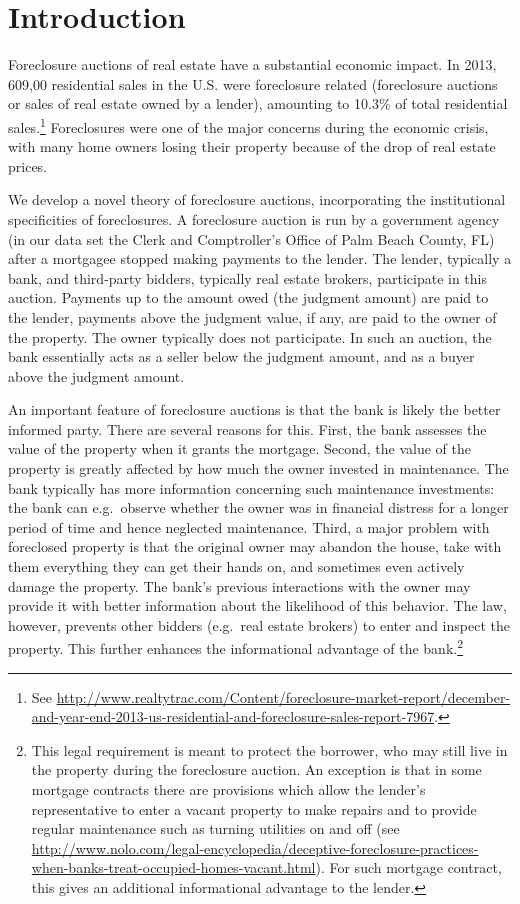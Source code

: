 \documentclass[11pt,twopage]{article}
\begin{document}
\section{Introduction}

Foreclosure auctions of real estate have a substantial economic
impact. In 2013, 609,00 residential sales in the U.S. were foreclosure related
(foreclosure auctions or sales of real estate
owned by a lender), amounting to 10.3\% of total residential sales.\footnote{See \url{http://www.realtytrac.com/Content/foreclosure-market-report/december-and-year-end-2013-us-residential-and-foreclosure-sales-report-7967}.}
Foreclosures were one of the major concerns during the economic
crisis, with many home owners losing their property because of the
drop of real estate prices. %

We develop a novel theory of foreclosure auctions, 
incorporating the institutional specificities of foreclosures. A
foreclosure auction is run by a government agency (in our data set
the Clerk and Comptroller's Office of Palm Beach County, FL) after a mortgagee stopped making
payments to the lender. The lender, typically a bank, and third-party
bidders, typically real estate brokers, 
participate in this auction. Payments up to the amount owed (the
judgment amount) are paid to the lender, payments above the judgment
value, if any, are paid to the owner of the property. The owner
typically does not participate. In such an auction, the bank
essentially acts as a seller below the judgment amount, and as a buyer above the judgment amount.

An important feature of foreclosure auctions is that the bank is likely the better informed party. There are several reasons for this. First, the bank assesses the value of the property when it grants the mortgage. Second, the value of the property is greatly affected by how much the owner invested in maintenance. The bank typically has more information concerning such maintenance investments: the bank can e.g.\ observe whether the owner was in financial distress for a longer period of time and hence neglected maintenance. Third, a major problem with foreclosed property is that the original owner may abandon the house, take with them everything they can get their hands on, and sometimes even actively damage the property. The bank's previous interactions with the owner may provide it with better information about the likelihood of this behavior. The law, however, prevents other bidders (e.g.\ real estate brokers) to enter and inspect the property. This  further enhances the informational advantage of the bank.\footnote{This legal requirement is meant to protect the borrower, who may still live in the property during the foreclosure auction. An exception is that in some mortgage contracts there are provisions which allow the lender's representative to enter a vacant property to make repairs and to provide regular maintenance such as turning utilities on and off (see \url{http://www.nolo.com/legal-encyclopedia/deceptive-foreclosure-practices-when-banks-treat-occupied-homes-vacant.html}). For such mortgage contract, this gives an additional informational advantage to the lender.}
\end{document}
